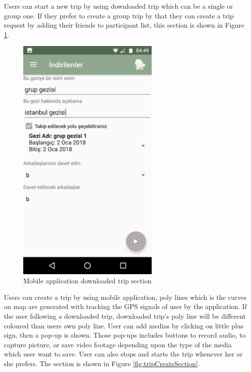 \newpage

Users can start a new trip by using downloaded trip which can be a single or group one. If they prefer to create a group trip by that they can create a trip request by adding their friends to   participant list, this section is shown in Figure \ref{fig:downloadedTripManage}.

\begin{figure}[!htbp]
\centering
\includegraphics[width=70mm,scale=0.7]{projectChapters/images/downloadedTripManage.png}
\caption{Mobile application downloaded trip section}
\label{fig:downloadedTripManage}
\end{figure}

\newpage

Users can create a trip by using mobile application, poly lines which is the curves on map are generated with tracking the GPS signals of user by the application. If the user following a downloaded trip, downloaded trip's poly line will be different coloured than users own poly line. User can add medias by clicking on little plus sign, then a pop-up is shown. Those pop-ups includes buttons to record audio, to capture picture, or save video footage depending upon the type of the media which user want to save. User can also stops and starts the trip whenever her or she prefers. The section is shown in Figure \ref{fig:tripCreateSection}.

